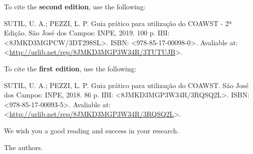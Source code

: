 \noindent To cite the \textbf{second edition}, use the following:
\bigskip

\noindent SUTIL, U. A.; PEZZI, L. P. Guia prático para utilização do COAWST - 2ª Edição. São José dos Campos: INPE, 2019. 100 p. IBI: <8JMKD3MGPCW/3DT298SL>. ISBN: <978-85-17-00098-0>. Avaliable at: <\textcolor{bleu_cite}{\href{http://urlib.net/rep/8JMKD3MGP3W34R/3TUTUJB}{http://urlib.net/rep/8JMKD3MGP3W34R/3TUTUJB}}>. 
\bigskip

\noindent To cite the \textbf{first edition}, use the following:
\bigskip

\noindent SUTIL, U. A.; PEZZI, L. P. Guia prático para utilização do COAWST. São José dos Campos: INPE, 2018. 86 p. IBI: <8JMKD3MGP3W34R/3RQSQ2L>. ISBN: <978-85-17-00093-5>. Avaliable at: <\textcolor{bleu_cite}{\href{http://urlib.net/rep/8JMKD3MGP3W34R/3RQSQ2L}{http://urlib.net/rep/8JMKD3MGP3W34R/3RQSQ2L}}>. 
\bigskip
\bigskip

\noindent We wish you a good reading and success in your research.
\bigskip

\noindent The authors.
